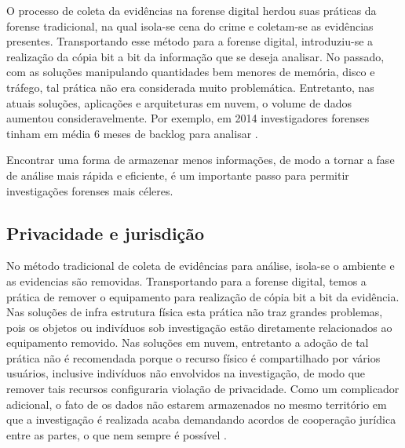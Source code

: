 O processo de coleta da evidências na forense digital herdou suas práticas da forense tradicional, na qual isola-se cena do crime e coletam-se as evidências presentes. 
%
Transportando esse método para a forense digital, introduziu-se a realização da cópia bit a bit da informação que se deseja analisar.
%
No passado, com as soluções manipulando quantidades bem menores de memória, disco e tráfego, tal prática não era considerada muito problemática. 
%
Entretanto, nas atuais soluções, aplicações e arquiteturas em nuvem, o volume de dados aumentou consideravelmente.
%
Por exemplo, em 2014 investigadores forenses tinham em média 6 meses de backlog para analisar \cite{QuickIncreaseVolumeImpact:2014} .


Encontrar uma forma de armazenar menos informações, de modo a tornar a fase de análise mais rápida e eficiente, é um importante passo para permitir investigações forenses mais céleres.


\subsection{Privacidade e jurisdição}
\label{sec:violacaoprivacidadejuriscdicao}

No método tradicional de coleta de evidências para análise, isola-se o ambiente e as evidencias são removidas. 
%
Transportando para a forense digital, temos a prática de remover o equipamento para realização de cópia bit a bit da evidência. 
%
Nas soluções de infra estrutura física esta prática não traz grandes problemas, pois os objetos ou indivíduos sob investigação estão diretamente relacionados ao equipamento removido.
%
Nas soluções em nuvem, entretanto a adoção de tal prática não é recomendada porque o recurso físico é compartilhado por vários usuários, inclusive indivíduos não envolvidos na investigação, de modo que remover tais recursos configuraria violação de privacidade.
%
Como um complicador adicional, o fato de os dados não estarem armazenados no mesmo território em que a investigação é realizada acaba demandando acordos de cooperação jurídica entre as partes, o que nem sempre é possível \cite{SimouCloudChlng:2014}.


